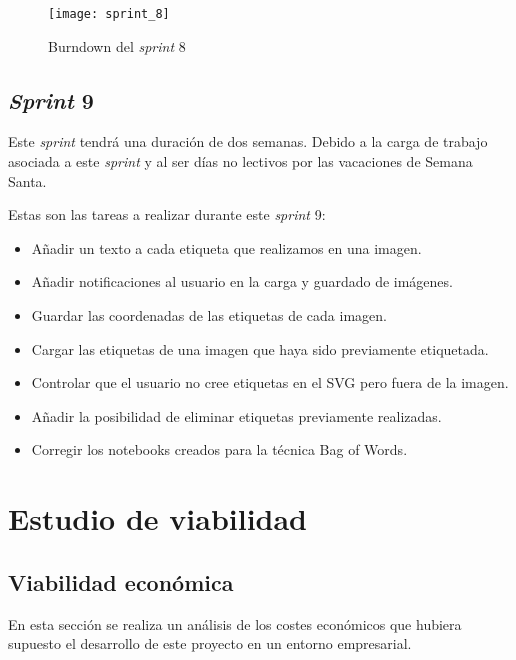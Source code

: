 \begin{figure}
\centering
\texttt{[image: sprint\_8]}
\caption{Burndown del \textit{sprint} 8}
\label{fig:A.1.9}
\end{figure}

\subsection{\textit{Sprint} 9}

Este \textit{sprint} tendrá una duración de dos semanas. Debido  a la carga de trabajo asociada a este \textit{sprint} y al ser días no lectivos por las vacaciones de Semana Santa. 

Estas son las tareas a realizar durante este \textit{sprint} 9:

\begin{itemize}
	\item Añadir un texto a cada etiqueta que realizamos en una imagen.
	\item Añadir notificaciones al usuario en la carga y guardado de imágenes.
	\item Guardar las coordenadas de las etiquetas de cada imagen.
	\item Cargar las etiquetas de una imagen que haya sido previamente etiquetada.
	\item Controlar que el usuario no cree etiquetas en el SVG pero fuera de la imagen.
	\item Añadir la posibilidad de eliminar etiquetas previamente realizadas.
	\item Corregir los notebooks creados para la técnica Bag of Words.
\end{itemize}


\begin{comment}
\begin{figure}
\centering
\texttt{[image: sprint\_9]}
\caption{Burndown del \textit{sprint} 9}
\label{fig:A.1.10}
\end{figure}
\end{comment}


\section{Estudio de viabilidad}

\subsection{Viabilidad económica}
En esta sección se realiza un análisis de los costes económicos que hubiera supuesto el desarrollo de este proyecto en un entorno empresarial.

